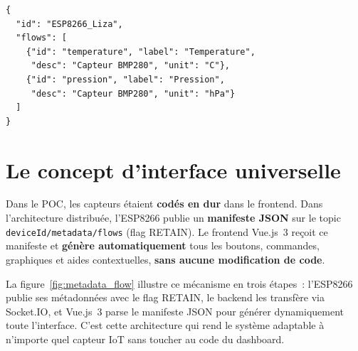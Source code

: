 \documentclass[12pt, a4paper]{report}
\begin{document}
\begin{lstlisting}[caption={Payload des m\'etadonn\'ees (RETAIN)},
                  label={lst:payload_meta}]
{
  "id": "ESP8266_Liza",
  "flows": [
    {"id": "temperature", "label": "Temperature",
     "desc": "Capteur BMP280", "unit": "C"},
    {"id": "pression", "label": "Pression",
     "desc": "Capteur BMP280", "unit": "hPa"}
  ]
}
\end{lstlisting}

\section{Le concept d'interface universelle}

\begin{evolutionbox}
Dans le POC, les capteurs \'etaient \textbf{cod\'es en dur} dans le
frontend. Dans l'architecture distribu\'ee, l'ESP8266 publie un
\textbf{manifeste JSON} sur le topic \texttt{deviceId/metadata/flows}
(flag RETAIN). Le frontend Vue.js~3 re\c{c}oit ce manifeste et
\textbf{g\'en\`ere automatiquement} tous les boutons, commandes,
graphiques et aides contextuelles, \textbf{sans aucune modification
de code}.
\end{evolutionbox}

La figure~\ref{fig:metadata_flow} illustre ce m\'ecanisme en trois
\'etapes~: l'ESP8266 publie ses m\'etadonn\'ees avec le flag RETAIN,
le backend les transf\`ere via Socket.IO, et Vue.js~3 parse le
manifeste JSON pour g\'en\'erer dynamiquement toute l'interface.
C'est cette architecture qui rend le syst\`eme adaptable \`a
n'importe quel capteur IoT sans toucher au code du dashboard.
\end{document}
